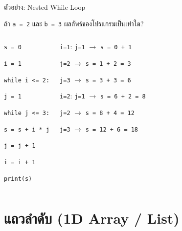 \documentclass[11pt, aspectratio=169]{beamer}
\newcommand{\py}[1]{\texttt{#1}}
\begin{document}
\begin{frame}{ตัวอย่าง: Nested While Loop}
  \begin{exambox}[โจทย์]
    ถ้า \py{a = 2} และ \py{b = 3} ผลลัพธ์ของโปรแกรมเป็นเท่าใด?
  \end{exambox}

  \begin{columns}[T]
      \begin{exambox}
        \py{s = 0}

        \py{i = 1}

        \py{while i <= 2:}

        \qquad \py{j = 1}

        \qquad \py{while j <= 3:}

        \qquad\quad \py{s = s + i * j}

        \qquad\quad \py{j = j + 1}

        \qquad \py{i = i + 1}

        \py{print(s)}
      \end{exambox}
      \begin{solbox}[วิธีตามรอย]
        \py{i=1}: \py{j=1} $\rightarrow$ \py{s = 0 + 1}

        \qquad\; \py{j=2} $\rightarrow$ \py{s = 1 + 2 = 3}

        \qquad\; \py{j=3} $\rightarrow$ \py{s = 3 + 3 = 6}

        \py{i=2}: \py{j=1} $\rightarrow$ \py{s = 6 + 2 = 8}

        \qquad\; \py{j=2} $\rightarrow$ \py{s = 8 + 4 = 12}

        \qquad\; \py{j=3} $\rightarrow$ \py{s = 12 + 6 = 18}

        \highlight{แสดงผล \py{18}}
      \end{solbox}
  \end{columns}
\end{frame}

\section{แถวลำดับ (1D Array / List)}
\end{document}
